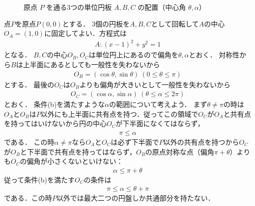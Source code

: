 \documentclass[../../main.tex]{subfiles}
\begin{document}
\begin{figure}[htb]
\begin{center}
  \end{center}
  \caption{原点 $P$ を通る3つの単位円板 $A, B, C$ の配置（中心角 $\theta, \alpha$）}
\end{figure}

点$P$を原点$P(0,0)$とする．
3個の円板を$A,B,C$として回転して$A$の中心$O_A=(1,0)$に固定してよい．方程式は
\begin{align}
  A: \left(x-1\right)^2 + y^2 = 1 \label{eq:1}
\end{align}
となる．
$B,C$の中心$O_B,O_C$は単位円上にあるので偏角を$\theta,\alpha$とおく．
対称性から$B$は上半面にあるとしても一般性を失わないから
\begin{align}
  O_B=(\cos\theta,\sin\theta)\ (0\le\theta\le\pi) \label{eq:2}
\end{align}
とする．
最後の$O_C$は$O_B$よりも偏角が大きいとして一般性を失わないから
\begin{align}
  O_C=(\cos\alpha,\sin\alpha)\ (\theta\le\alpha\le2\pi) \label{eq:3}
\end{align}
とおく．
条件(b)を満たすような$\alpha$の範囲について考えよう．
まず$\theta \neq \pi$の時は$O_A$と$O_B$は$P$以外にも上半面に共有点を持つ．従ってこの領域で$O_C$が$O_A$と共有点を持ってはいけないから円の中心$O_C$が下半面になくてはならず，
\begin{align}
  \pi \le \alpha
\end{align}
である．
この時$\alpha \neq \pi$なら$O_A$と$O_C$は必ず下半面で$P$以外の共有点を持つから$O_C$が$O_B$と下半面で共有点を持ってはならず，$O_B$の原点対称な点（偏角$\pi+\theta$）よりも$O_C$の偏角が小さくないといけない：
\begin{align}
  \alpha \le \pi + \theta
\end{align}
従って条件(b)を満たす$O_C$の条件は
\begin{align}
  \pi\le\alpha\le\theta+\pi \label{eq:4}
\end{align}
である．この時$P$以外では最大二つの円盤しか共通部分を持たない．
\end{document}
